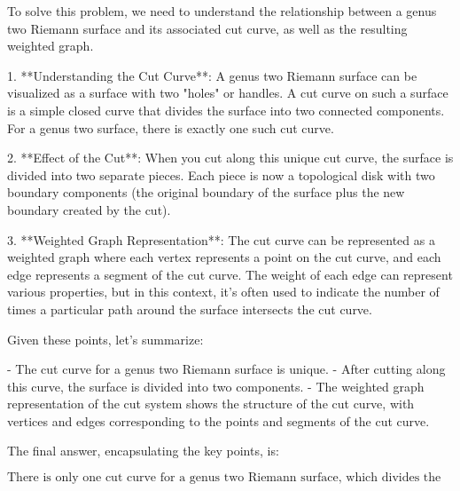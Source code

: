 To solve this problem, we need to understand the relationship between a genus two Riemann surface and its associated cut curve, as well as the resulting weighted graph.

1. **Understanding the Cut Curve**: A genus two Riemann surface can be visualized as a surface with two "holes" or handles. A cut curve on such a surface is a simple closed curve that divides the surface into two connected components. For a genus two surface, there is exactly one such cut curve.

2. **Effect of the Cut**: When you cut along this unique cut curve, the surface is divided into two separate pieces. Each piece is now a topological disk with two boundary components (the original boundary of the surface plus the new boundary created by the cut).

3. **Weighted Graph Representation**: The cut curve can be represented as a weighted graph where each vertex represents a point on the cut curve, and each edge represents a segment of the cut curve. The weight of each edge can represent various properties, but in this context, it's often used to indicate the number of times a particular path around the surface intersects the cut curve.

Given these points, let's summarize:

- The cut curve for a genus two Riemann surface is unique.
- After cutting along this curve, the surface is divided into two components.
- The weighted graph representation of the cut system shows the structure of the cut curve, with vertices and edges corresponding to the points and segments of the cut curve.

The final answer, encapsulating the key points, is:

\[
\boxed{\text{There is only one cut curve for a genus two Riemann surface, which divides the surface into two components.}}
\]